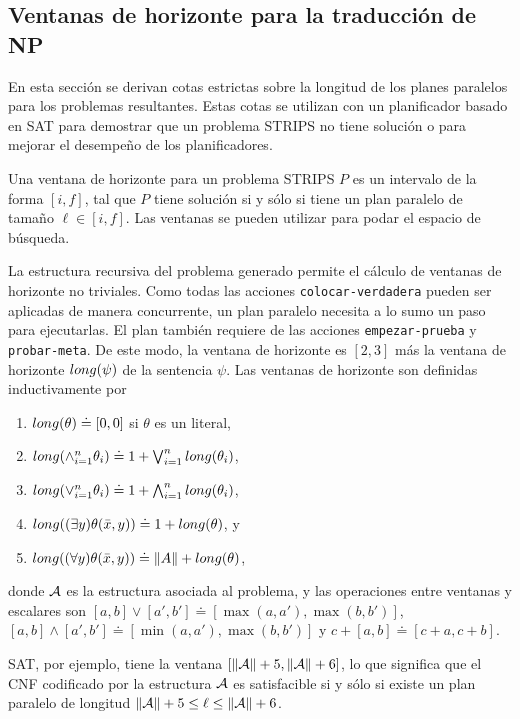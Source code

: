 \subsection{Ventanas de horizonte para la traducción de NP}

En esta sección se derivan cotas estrictas sobre la longitud de los planes
paralelos para los problemas resultantes. Estas cotas se utilizan con un
planificador basado en SAT para demostrar que un problema STRIPS no tiene
solución o para mejorar el desempeño de los planificadores.

Una ventana de horizonte para un problema STRIPS $P$ es un intervalo de la
forma $[i,f]$, tal que $P$ tiene solución si y sólo si tiene un plan paralelo 
de tamaño $\ell\in[i,f]$. Las ventanas se pueden utilizar para podar el espacio de
búsqueda.

La estructura recursiva del problema generado permite el cálculo de ventanas de
horizonte no triviales. Como todas las acciones \texttt{colocar-verdadera}
pueden ser aplicadas de manera concurrente, un plan paralelo necesita a lo sumo un paso para
ejecutarlas. El plan también requiere de las acciones \texttt{empezar-prueba}
y \texttt{probar-meta}. De este modo, la ventana de horizonte es $[2,3]$ más la
ventana de horizonte $long(\psi)$ de la sentencia $\psi$. Las ventanas de
horizonte son definidas inductivamente por

\begin{enumerate}[--]
\item $long(\theta)\doteq [0,0]$ si $\theta$ es un literal,
\item $long(\wedge_{i=1}^n \theta_i)\doteq 1+\bigvee_{i=1}^n long(\theta_i)$,
\item $long(\vee_{i=1}^n \theta_i)\doteq 1+\bigwedge_{i=1}^n long(\theta_i)$,
\item $long((\exists y)\theta(\bar x,y))\doteq 1+long(\theta)$, y
\item $long((\forall y)\theta(\bar x,y))\doteq \|A\|+long(\theta)$,
\end{enumerate}
donde $\mathcal{A}$ es la estructura asociada al problema, y las operaciones entre
ventanas y escalares son
$[a,b]\vee[a',b']\doteq[\max(a,a'),\max(b,b')]$,
$[a,b]\wedge[a',b']\doteq[\min(a,a'),\max(b,b')]$ y
$c+[a,b]\doteq[c+a,c+b]$.

SAT, por ejemplo, tiene la ventana $[\|\mathcal{A}\|+5,\|\mathcal{A}\|+6]$,
lo que significa que el CNF codificado por la estructura $\mathcal{A}$ es satisfacible
si y sólo si existe un plan paralelo de longitud $\|\mathcal{A}\|+5\leq\ell\leq\|\mathcal{A}\|+6$.

